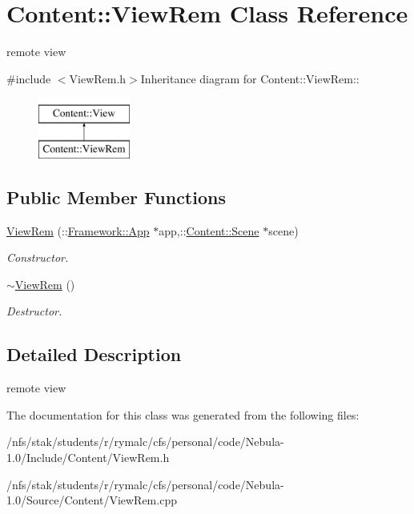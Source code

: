 \hypertarget{classContent_1_1ViewRem}{
\section{Content::ViewRem Class Reference}
\label{classContent_1_1ViewRem}
}


remote view  


{\ttfamily \#include $<$ViewRem.h$>$}Inheritance diagram for Content::ViewRem::\begin{figure}[H]
\begin{center}
\leavevmode
\includegraphics[height=2cm]{classContent_1_1ViewRem}
\end{center}
\end{figure}
\subsection*{Public Member Functions}
\begin{DoxyCompactItemize}
\item 
\hypertarget{classContent_1_1ViewRem_ad5efc14dc830ab2e51e1bbde24624476}{
\hyperlink{classContent_1_1ViewRem_ad5efc14dc830ab2e51e1bbde24624476}{ViewRem} (::\hyperlink{classFramework_1_1App}{Framework::App} $\ast$app,::\hyperlink{classContent_1_1Scene}{Content::Scene} $\ast$scene)}
\label{classContent_1_1ViewRem_ad5efc14dc830ab2e51e1bbde24624476}

\begin{DoxyCompactList}\small\item\em Constructor. \item\end{DoxyCompactList}\item 
\hypertarget{classContent_1_1ViewRem_af1c174ccfd1d6f3faf2f6d707f7c579f}{
\hyperlink{classContent_1_1ViewRem_af1c174ccfd1d6f3faf2f6d707f7c579f}{$\sim$ViewRem} ()}
\label{classContent_1_1ViewRem_af1c174ccfd1d6f3faf2f6d707f7c579f}

\begin{DoxyCompactList}\small\item\em Destructor. \item\end{DoxyCompactList}\end{DoxyCompactItemize}


\subsection{Detailed Description}
remote view 

The documentation for this class was generated from the following files:\begin{DoxyCompactItemize}
\item 
/nfs/stak/students/r/rymalc/cfs/personal/code/Nebula-\/1.0/Include/Content/ViewRem.h\item 
/nfs/stak/students/r/rymalc/cfs/personal/code/Nebula-\/1.0/Source/Content/ViewRem.cpp\end{DoxyCompactItemize}

